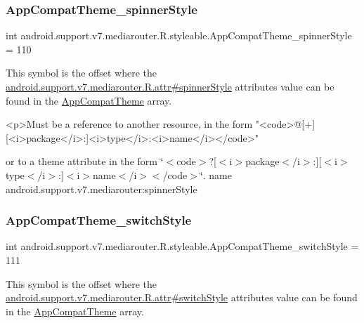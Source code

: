 \subsubsection{\texorpdfstring{App\+Compat\+Theme\+\_\+spinner\+Style}{AppCompatTheme\_spinnerStyle}}
{\footnotesize\ttfamily int android.\+support.\+v7.\+mediarouter.\+R.\+styleable.\+App\+Compat\+Theme\+\_\+spinner\+Style = 110\hspace{0.3cm}{\ttfamily [static]}}

This symbol is the offset where the \hyperlink{classandroid_1_1support_1_1v7_1_1mediarouter_1_1R_1_1attr_a6bbcb4b4bdf41ad15231f9ec5bb86d9c}{android.\+support.\+v7.\+mediarouter.\+R.\+attr\#spinner\+Style} attribute\textquotesingle{}s value can be found in the \hyperlink{classandroid_1_1support_1_1v7_1_1mediarouter_1_1R_1_1styleable_a4e3d3900c75d49aeb2f283cac00214d6}{App\+Compat\+Theme} array.

\begin{DoxyVerb}      <p>Must be a reference to another resource, in the form "<code>@[+][<i>package</i>:]<i>type</i>:<i>name</i></code>"
\end{DoxyVerb}
 or to a theme attribute in the form \char`\"{}$<$code$>$?\mbox{[}$<$i$>$package$<$/i$>$\+:\mbox{]}\mbox{[}$<$i$>$type$<$/i$>$\+:\mbox{]}$<$i$>$name$<$/i$>$$<$/code$>$\char`\"{}.  name android.\+support.\+v7.\+mediarouter\+:spinner\+Style \mbox{\label{classandroid_1_1support_1_1v7_1_1mediarouter_1_1R_1_1styleable_a45f08971148574331038a7defe008f80}} 
\subsubsection{\texorpdfstring{App\+Compat\+Theme\+\_\+switch\+Style}{AppCompatTheme\_switchStyle}}
{\footnotesize\ttfamily int android.\+support.\+v7.\+mediarouter.\+R.\+styleable.\+App\+Compat\+Theme\+\_\+switch\+Style = 111\hspace{0.3cm}{\ttfamily [static]}}

This symbol is the offset where the \hyperlink{classandroid_1_1support_1_1v7_1_1mediarouter_1_1R_1_1attr_a8256dc7bd973274b19cb4aeb043d03a5}{android.\+support.\+v7.\+mediarouter.\+R.\+attr\#switch\+Style} attribute\textquotesingle{}s value can be found in the \hyperlink{classandroid_1_1support_1_1v7_1_1mediarouter_1_1R_1_1styleable_a4e3d3900c75d49aeb2f283cac00214d6}{App\+Compat\+Theme} array.

